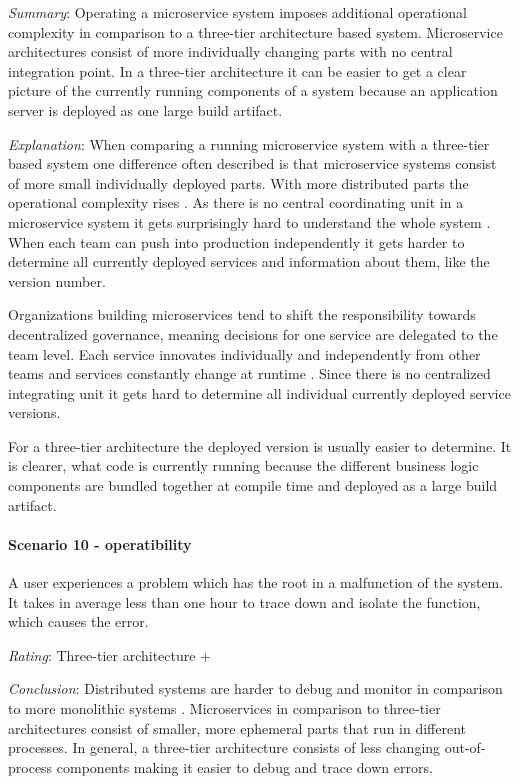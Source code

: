 \textit{Summary}: Operating a microservice system imposes additional operational complexity in comparison to a three-tier architecture based system.
Microservice architectures consist of more individually changing parts with no central integration point.
In a three-tier architecture it can be easier to get a clear picture of the currently running components of a system because an application server is deployed as one large build artifact.

\textit{Explanation}:
When comparing a running microservice system with a three-tier based system one difference often described is that microservice systems consist of more small individually deployed parts.
With more distributed parts the operational complexity rises \citep[p. 241]{Wolff2016}.
As there is no central coordinating unit in a microservice system it gets surprisingly hard to understand the whole system \cite{Cockcroft2014}.
When each team can push into production independently it gets harder to determine all currently deployed services and information about them, like the version number.

Organizations building microservices tend to shift the responsibility towards decentralized governance, meaning decisions for one service are delegated to the team level.
Each service innovates individually and independently from other teams and services constantly change at runtime \citep[28:20]{NetflixMSAtScale2016}.
Since there is no centralized integrating unit it gets hard to determine all individual currently deployed service versions.

For a three-tier architecture the deployed version is usually easier to determine.
It is clearer, what code is currently running because the different business logic components are bundled together at compile time and deployed as a large build artifact.

\paragraph{Scenario 10 - operatibility}
A user experiences a problem which has the root in a malfunction of the system. It takes in average less than one hour to trace down and isolate the function, which causes the error.
\label{quaMicro:s10}

\textit{Rating}: Three-tier architecture +

\textit{Conclusion}:
Distributed systems are harder to debug and monitor in comparison to more monolithic systems \citep[p. 155]{Newman2015}.
Microservices in comparison to three-tier architectures consist of smaller, more ephemeral parts that run in different processes.
In general, a three-tier architecture consists of less changing out-of-process components making it easier to debug and trace down errors.


